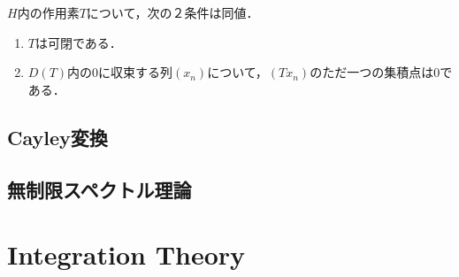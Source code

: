 \documentclass[uplatex,dvipdfmx]{jsreport}
\begin{document}
\begin{lemma}
    $H$内の作用素$T$について，次の２条件は同値．
    \begin{enumerate}
        \item $T$は可閉である．
        \item $D(T)$内の$0$に収束する列$(x_n)$について，$(Tx_n)$のただ一つの集積点は$0$である．
    \end{enumerate}
\end{lemma}

\section{Cayley変換}

\section{無制限スペクトル理論}

\chapter{Integration Theory}
\end{document}
